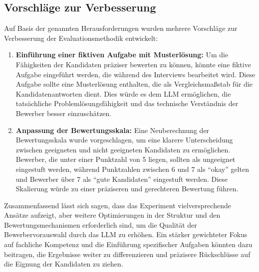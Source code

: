 \subsection{Vorschläge zur Verbesserung}

Auf Basis der genannten Herausforderungen wurden mehrere Vorschläge zur Verbesserung der Evaluationsmethodik entwickelt:

\begin{enumerate}
    \item \textbf{Einführung einer fiktiven Aufgabe mit Musterlösung:} Um die Fähigkeiten der Kandidaten präziser bewerten zu können, könnte eine fiktive Aufgabe eingeführt werden, die während des Interviews bearbeitet wird. Diese Aufgabe sollte eine Musterlösung enthalten, die als Vergleichsmaßstab für die Kandidatenantworten dient. Dies würde es dem \acs{LLM} ermöglichen, die tatsächliche Problemlösungsfähigkeit und das technische Verständnis der Bewerber besser einzuschätzen.
    \item \textbf{Anpassung der Bewertungsskala:} Eine Neuberechnung der Bewertungsskala wurde vorgeschlagen, um eine klarere Unterscheidung zwischen geeigneten und nicht geeigneten Kandidaten zu ermöglichen. Bewerber, die unter einer Punktzahl von 5 liegen, sollten als ungeeignet eingestuft werden, während Punktzahlen zwischen 6 und 7 als \enquote{okay} gelten und Bewerber über 7 als \enquote{gute Kandidaten} eingestuft werden. Diese Skalierung würde zu einer präziseren und gerechteren Bewertung führen.
\end{enumerate}

Zusammenfassend lässt sich sagen, dass das Experiment vielversprechende Ansätze aufzeigt, aber weitere Optimierungen in der Struktur und den Bewertungsmechanismen erforderlich sind, um die Qualität der Bewerbervorauswahl durch das \acs{LLM} zu erhöhen. Ein stärker gewichteter Fokus auf fachliche Kompetenz und die Einführung spezifischer Aufgaben könnten dazu beitragen, die Ergebnisse weiter zu differenzieren und präzisere Rückschlüsse auf die Eignung der Kandidaten zu ziehen.